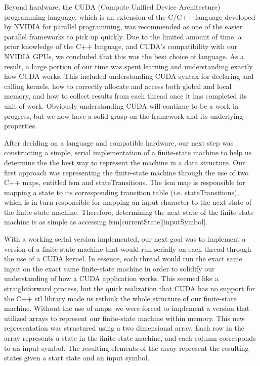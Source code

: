 \documentclass[11pt]{sigplanconf}
\begin{document}
Beyond hardware, the CUDA (Compute Unified Device Architecture) programming language, which is an extension of the C/C++ language developed by NVIDIA for parallel programming, was recommended as one of the easier parallel frameworks to pick up quickly. Due to the limited amount of time, a prior knowledge of the C++ language, and CUDA's compatibility with our NVIDIA GPUs, we concluded that this was the best choice of language. As a result, a large portion of our time was spent learning and understanding exactly how CUDA works. This included understanding CUDA syntax for declaring and calling kernels, how to correctly allocate and access both global and local memory, and how to collect results from each thread once it has completed its unit of work. Obviously understanding CUDA will continue to be a work in progress, but we now have a solid grasp on the framework and its underlying properties.

After deciding on a language and compatible hardware, our next step was constructing a simple, serial implementation of a finite-state machine to help us determine the the best way to represent the machine in a data structure. Our first approach was representing the finite-state machine through the use of two C++ maps, entitled fsm and stateTransitions. The fsm map is responsible for mapping a state to its corresponding transition table (i.e. stateTransitions), which is in turn responsible for mapping an input character to the next state of the finite-state machine. Therefore, determining the next state of the finite-state machine is as simple as accessing fsm[currentState][inputSymbol]. 

With a working serial version implemented, our next goal was to implement a version of a finite-state machine that would run serially on each thread through the use of a CUDA kernel. In essence, each thread would run the exact same input on the exact same finite-state machine in order to solidify our understanding of how a CUDA application works. This seemed like a straightforward process, but the quick realization that CUDA has no support for the C++ stl library made us rethink the whole structure of our finite-state machine. Without the use of maps, we were forced to implement a version that utilized arrays to represent our finite-state machine within memory. This new representation was structured using a two dimensional array. Each row in the array represents a state in the finite-state machine, and each column corresponds to an input symbol. The resulting elements of the array represent the resulting states given a start state and an input symbol.
\end{document}
